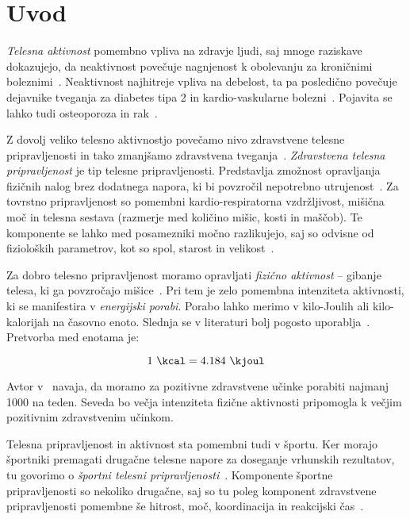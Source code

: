\chapter{Uvod} \label{uvod}
\emph{Telesna aktivnost} pomembno vpliva na zdravje ljudi, saj mnoge raziskave dokazujejo, da neaktivnost povečuje nagnjenost k obolevanju za kroničnimi boleznimi~\cite{warburton2006health}. Neaktivnost najhitreje vpliva na debelost, ta pa posledično povečuje dejavnike tveganja za diabetes tipa 2 in kardio-vaskularne bolezni~\cite{bassuk2005epidemiological}. Pojavita se lahko tudi osteoporoza in rak~\cite{warburton2006health}. 

Z dovolj veliko telesno aktivnostjo povečamo nivo zdravstvene telesne pripravljenosti in tako zmanjšamo zdravstvena tveganja~\cite{caspersen1985physical}. \emph{Zdravstvena telesna pripravljenost} je tip telesne pripravljenosti. Predstavlja zmožnost opravljanja fizičnih nalog brez dodatnega napora, ki bi povzročil nepotrebno utrujenost~\cite{caspersen1985physical}. Za tovrstno pripravljenost so pomembni kardio-respiratorna vzdržljivost, mišična moč in telesna sestava (razmerje med količino mišic, kosti in maščob). Te komponente se lahko med posamezniki močno razlikujejo, saj so odvisne od fizioloških parametrov, kot so spol, starost in velikost~\cite{caspersen1985physical}.

Za dobro telesno pripravljenost moramo opravljati \emph{fizično aktivnost} -- gibanje telesa, ki ga povzročajo mišice~\cite{caspersen1985physical}. Pri tem je zelo pomembna intenziteta aktivnosti, ki se manifestira v \emph{energijski porabi}. Porabo lahko merimo v kilo-Joulih ali kilo-kalorijah na časovno enoto. Slednja se v literaturi bolj pogosto uporablja~\cite{caspersen1985physical}. Pretvorba med enotama je: 

\begin{equation} \label{eq:pretvorba}
	1~\mathrm{\si{\kcal}} = \num{4.184}~\mathrm{\si{\kjoul}}
\end{equation}


Avtor v~\cite{warburton2006health} navaja, da moramo za pozitivne zdravstvene učinke porabiti najmanj \SI{1000}{\kcal} na teden. Seveda bo večja intenziteta fizične aktivnosti pripomogla k večjim pozitivnim zdravstvenim učinkom.

Telesna pripravljenost in aktivnost sta pomembni tudi v športu. Ker morajo športniki premagati drugačne telesne napore za doseganje vrhunskih rezultatov, tu govorimo o \emph{športni telesni pripravljenosti}~\cite{caspersen1985physical}. Komponente športne pripravljenosti so nekoliko drugačne, saj so tu poleg komponent zdravstvene pripravljenosti pomembne še hitrost, moč, koordinacija in reakcijski čas~\cite{caspersen1985physical}.

